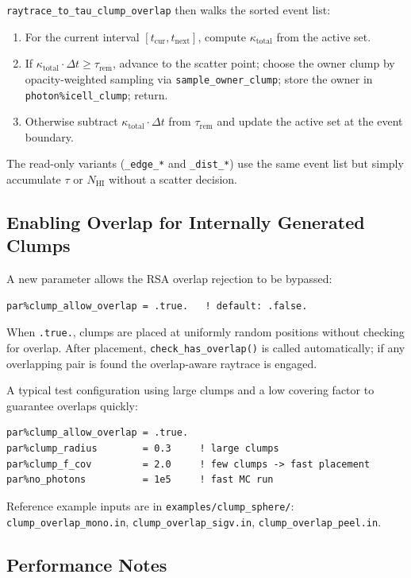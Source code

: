 \documentclass[english,a4paper]{my_memo}
\begin{document}
\texttt{raytrace\_to\_tau\_clump\_overlap} then walks the sorted event
list:
\begin{enumerate}
\item For the current interval $[t_\mathrm{cur}, t_\mathrm{next}]$,
      compute $\kappa_\mathrm{total}$ from the active set.
\item If $\kappa_\mathrm{total} \cdot \Delta t \ge \tau_\mathrm{rem}$,
      advance to the scatter point; choose the owner clump by
      opacity-weighted sampling via \texttt{sample\_owner\_clump}; store
      the owner in \texttt{photon\%icell\_clump}; return.
\item Otherwise subtract $\kappa_\mathrm{total} \cdot \Delta t$ from
      $\tau_\mathrm{rem}$ and update the active set at the event boundary.
\end{enumerate}
The read-only variants (\texttt{\_edge\_*} and \texttt{\_dist\_*}) use
the same event list but simply accumulate $\tau$ or $N_\mathrm{HI}$
without a scatter decision.

\subsection{Enabling Overlap for Internally Generated Clumps}

A new parameter allows the RSA overlap rejection to be bypassed:
\begin{lstlisting}
par%clump_allow_overlap = .true.   ! default: .false.
\end{lstlisting}
When \texttt{.true.}, clumps are placed at uniformly random positions
without checking for overlap.  After placement,
\texttt{check\_has\_overlap()} is called automatically; if any
overlapping pair is found the overlap-aware raytrace is engaged.

A typical test configuration using large clumps and a low covering
factor to guarantee overlaps quickly:
\begin{lstlisting}
par%clump_allow_overlap = .true.
par%clump_radius        = 0.3     ! large clumps
par%clump_f_cov         = 2.0     ! few clumps -> fast placement
par%no_photons          = 1e5     ! fast MC run
\end{lstlisting}
\begin{sloppypar}
Reference example inputs are in \texttt{examples/clump\_sphere/}:
\texttt{clump\_overlap\_mono.in},
\texttt{clump\_overlap\_sigv.in},
\texttt{clump\_overlap\_peel.in}.
\end{sloppypar}

\subsection{Performance Notes}
\end{document}
